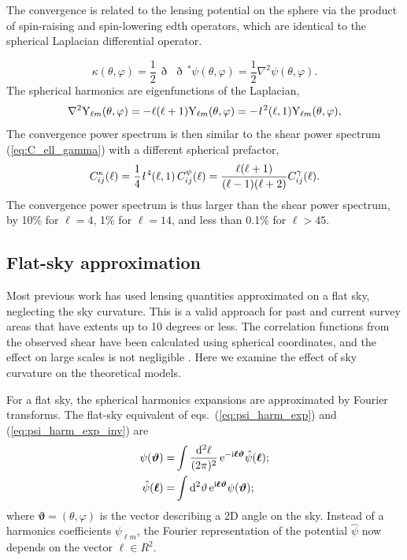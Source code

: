 \documentclass[fleqn,usenatbib]{mnras} %
\newcommand{\ellbar}{\hbox{\it \l}\,}
\newcommand{\edth}{\,\eth\,}
\renewcommand{\vec}{\bm}
\begin{document}
The convergence is related to the lensing potential on the sphere via the
product of spin-raising and spin-lowering edth operators, which are identical
to the spherical Laplacian differential operator.

%
\begin{equation}
  \kappa(\theta, \varphi) = \frac 1 2 \edth \edth^\ast \psi(\theta, \varphi) = \frac 1 2 \nabla^2 \psi(\theta, \varphi).
  \label{eq:kappa_psi_spher}
\end{equation}
%
The spherical harmonics are eigenfunctions of the Laplacian,
%
\begin{equation}
  \nabla^2 {\rm Y}_{\ell m}(\theta, \varphi) = - \ell (\ell + 1) {\rm Y}_{\ell m}(\theta, \varphi)
    = - \ellbar^2(\ell, 1) {\rm Y}_{\ell m}(\theta, \varphi),
  \label{eq:nabla_Ylm}
\end{equation}
%
The convergence power spectrum is then similar to the shear power spectrum
(\ref{eq:C_ell_gamma}) with a different spherical prefactor,
%
\begin{equation}
  C^\kappa_{ij}(\ell) = \frac 1 4 \ellbar^4(\ell, 1) \, C^\psi_{ij}(\ell)
    = \frac{\ell (\ell+1)}{(\ell-1)(\ell+2)} C^\gamma_{ij}(\ell) .
  \label{eq:C_ell_kappa_full}
\end{equation}
%
The convergence power spectrum is thus larger than the shear power spectrum, by
10\% for $\ell=4$, 1\% for $\ell = 14$, and less than 0.1\% for $\ell>45$.


\subsection{Flat-sky approximation}

Most previous work has used lensing quantities approximated on a flat sky,
neglecting the sky curvature. This is a valid approach for past and current
survey areas that have extents up to 10 degrees or less. The correlation
functions from the observed shear have been calculated using spherical
coordinates, and the effect on large scales is not negligible \citep{FSHK08}.
Here we examine the effect of sky curvature on the theoretical models.

For a flat sky, the spherical harmonics expansions are approximated by Fourier
transforms. The flat-sky equivalent of eqs.~(\ref{eq:psi_harm_exp}) and
(\ref{eq:psi_harm_exp_inv}) are
%
\begin{align}
  \psi(\vec \vartheta) = & \int \frac{{\rm d}^2 \ell}{(2\pi)^2} \, {\rm e}^{-{\rm i} \vec \ell \vec \vartheta} \hat \psi(\vec \ell);
  \label{eq:psi_fourier}
  \\
  \hat \psi(\vec \ell) = & \int {\rm d}^2 \vartheta \, {\rm e}^{{\rm i} \vec \ell \vec \vartheta} \psi(\vec \vartheta);
  \label{eq:psi_fourier_inv}
\end{align}
%
where $\vec \vartheta = (\theta, \varphi)$ is the vector describing a 2D angle on the sky.
Instead of a harmonics coefficients $\psi_{\ell m}$, the Fourier representation of the potential
$\hat \psi$ now depends on the vector $\vec \ell \in R^2$.
\end{document}
